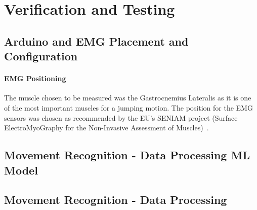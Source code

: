 

%

\chapter{Verification and Testing}
\label{cha:verificaton_testing}

\section{Arduino and EMG Placement and Configuration}
\label{sec:arduino_emg_placement}

\subsubsection{EMG Positioning}
\label{sssec:emg_positioning}

The muscle chosen to be measured was the Gastrocnemius Lateralis as it is one of the most important muscles for a jumping motion.
The position for the \gls{EMG} sensors was chosen as recommended by the \gls{EU}'s SENIAM project (Surface ElectroMyoGraphy for the Non-Invasive Assessment of Muscles)~\cite{emgPosition}.



\section{Movement Recognition - Data Processing ML Model}
\label{sec:data_processing_ML}

\section{Movement Recognition - Data Processing}
\label{sec:data_processing_VT}


